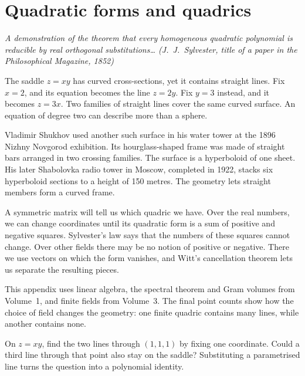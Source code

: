 \chapter{Quadratic forms and quadrics}\label{geometry:ch:quadrics}

\begin{center}\itshape
A demonstration of the theorem that every homogeneous quadratic polynomial is reducible by real orthogonal substitutions\dots
\upshape(J.~J.~Sylvester, title of a paper in the \emph{Philosophical Magazine}, 1852)
\end{center}

The saddle $z=xy$ has curved cross-sections, yet it contains straight lines.
Fix $x=2$, and its equation becomes the line $z=2y$. Fix $y=3$ instead,
and it becomes $z=3x$. Two families of straight lines cover the same
curved surface. An equation of degree two can describe more than a sphere.

Vladimir Shukhov used another such surface in his water tower at the 1896
Nizhny Novgorod exhibition. Its hourglass-shaped frame was made of straight
bars arranged in two crossing families. The surface is a hyperboloid of
one sheet. His later Shabolovka radio tower in Moscow, completed in 1922,
stacks six hyperboloid sections to a height of 150 metres.
The geometry lets straight members form a curved frame.


A symmetric matrix will tell us which quadric we have. Over the real
numbers, we can change coordinates until its quadratic form is a sum of
positive and negative squares. Sylvester's law says that the numbers of
these squares cannot change. Over other fields there may be no notion of
positive or negative. There we use vectors on which the form vanishes,
and Witt's cancellation theorem lets us separate the resulting pieces.

This appendix uses linear algebra, the spectral theorem and Gram volumes
from Volume~1, and finite fields from Volume~3. The final point counts
show how the choice of field changes the geometry: one finite quadric
contains many lines, while another contains none.

\begin{think}
On $z=xy$, find the two lines through $(1,1,1)$ by fixing one coordinate.
Could a third line through that point also stay on the saddle? Substituting
a parametrised line turns the question into a polynomial identity.
\end{think}

